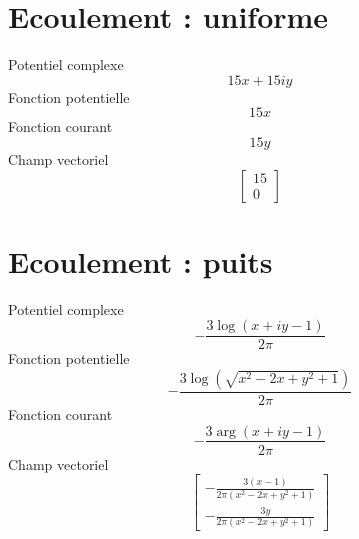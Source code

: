 \documentclass{article}
\begin{document}
\section*{Ecoulement : uniforme}
Potentiel complexe \[15 x + 15 i y\]
Fonction potentielle \[15 x\]
Fonction courant \[15 y\]
Champ vectoriel \[\left[\begin{matrix}15\\0\end{matrix}\right]\]
\section*{Ecoulement : puits}
Potentiel complexe \[- \frac{3 \log{\left(x + i y - 1 \right)}}{2 \pi}\]
Fonction potentielle \[- \frac{3 \log{\left(\sqrt{x^{2} - 2 x + y^{2} + 1} \right)}}{2 \pi}\]
Fonction courant \[- \frac{3 \arg{\left(x + i y - 1 \right)}}{2 \pi}\]
Champ vectoriel \[\left[\begin{matrix}- \frac{3 \left(x - 1\right)}{2 \pi \left(x^{2} - 2 x + y^{2} + 1\right)}\\- \frac{3 y}{2 \pi \left(x^{2} - 2 x + y^{2} + 1\right)}\end{matrix}\right]\]
\end{document}
